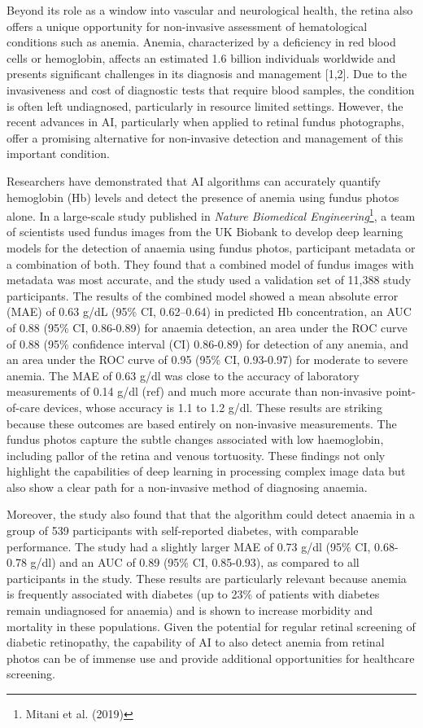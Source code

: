 \documentclass[
  Letterpaper,
]{scrbook}
\begin{document}
Beyond its role as a window into vascular and neurological health, the
retina also offers a unique opportunity for non-invasive assessment of
hematological conditions such as anemia. Anemia, characterized by a
deficiency in red blood cells or hemoglobin, affects an estimated 1.6
billion individuals worldwide and presents significant challenges in its
diagnosis and management {[}1,2{]}. Due to the invasiveness and cost of
diagnostic tests that require blood samples, the condition is often left
undiagnosed, particularly in resource limited settings. However, the
recent advances in AI, particularly when applied to retinal fundus
photographs, offer a promising alternative for non-invasive detection
and management of this important condition.

Researchers have demonstrated that AI algorithms can accurately quantify
hemoglobin (Hb) levels and detect the presence of anemia using fundus
photos alone. In a large-scale study published in \emph{Nature
Biomedical Engineering}\footnote{Mitani et al. (2019)}, a team of
scientists used fundus images from the UK Biobank to develop deep
learning models for the detection of anaemia using fundus photos,
participant metadata or a combination of both. They found that a
combined model of fundus images with metadata was most accurate, and the
study used a validation set of 11,388 study participants. The results of
the combined model showed a mean absolute error (MAE) of 0.63 g/dL (95\%
CI, 0.62--0.64) in predicted Hb concentration, an AUC of 0.88 (95\% CI,
0.86-0.89) for anaemia detection, an area under the ROC curve of 0.88
(95\% confidence interval (CI) 0.86-0.89) for detection of any anemia,
and an area under the ROC curve of 0.95 (95\% CI, 0.93-0.97) for
moderate to severe anemia. The MAE of 0.63 g/dl was close to the
accuracy of laboratory measurements of 0.14 g/dl (ref) and much more
accurate than non-invasive point-of-care devices, whose accuracy is 1.1
to 1.2 g/dl. These results are striking because these outcomes are based
entirely on non-invasive measurements. The fundus photos capture the
subtle changes associated with low haemoglobin, including pallor of the
retina and venous tortuosity. These findings not only highlight the
capabilities of deep learning in processing complex image data but also
show a clear path for a non-invasive method of diagnosing anaemia.

Moreover, the study also found that that the algorithm could detect
anaemia in a group of 539 participants with self-reported diabetes, with
comparable performance. The study had a slightly larger MAE of 0.73 g/dl
(95\% CI, 0.68-0.78 g/dl) and an AUC of 0.89 (95\% CI, 0.85-0.93), as
compared to all participants in the study. These results are
particularly relevant because anemia is frequently associated with
diabetes (up to 23\% of patients with diabetes remain undiagnosed for
anaemia) and is shown to increase morbidity and mortality in these
populations. Given the potential for regular retinal screening of
diabetic retinopathy, the capability of AI to also detect anemia from
retinal photos can be of immense use and provide additional
opportunities for healthcare screening.
\end{document}
